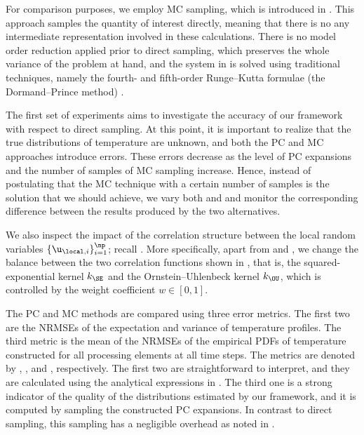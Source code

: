 For comparison purposes, we employ \ac{MC} sampling, which is introduced in
. This approach samples the quantity of interest directly, meaning
that there is no any intermediate representation involved in these calculations.
There is no model order reduction applied prior to direct sampling, which
preserves the whole variance of the problem at hand, and the system in
 is solved using traditional techniques, namely
the fourth- and fifth-order Runge--Kutta formulae (the Dormand--Prince method)
\cite{press2007}.


The first set of experiments aims to investigate the accuracy of our framework
with respect to direct sampling. At this point, it is important to realize that
the true distributions of temperature are unknown, and both the \ac{PC} and
\ac{MC} approaches introduce errors. These errors decrease as the level \lc of
\ac{PC} expansions and the number of samples \no of \ac{MC} sampling increase.
Hence, instead of postulating that the \ac{MC} technique with a certain number
of samples is the solution that we should achieve, we vary both \lc and \no and
monitor the corresponding difference between the results produced by the two
alternatives.

We also inspect the impact of the correlation structure between the local random
variables $\{ \u_{\local, i} \}_{i = 1}^\np$; recall
. More specifically, apart from \lc and \no,
we change the balance between the two correlation functions shown in
, that is, the squared-exponential kernel $k_\SE$ and
the Ornstein--Uhlenbeck kernel $k_\OU$, which is controlled by the weight
coefficient $w \in [0, 1]$.

The \ac{PC} and \ac{MC} methods are compared using three error metrics. The
first two are the \acp{NRMSE} of the expectation and variance of temperature
profiles. The third metric is the mean of the \acp{NRMSE} of the empirical
\acp{PDF} of temperature constructed for all processing elements at all time
steps. The metrics are denoted by \error{\expectation}, \error{\variance}, and
, respectively. The first two are straightforward to interpret, and
they are calculated using the analytical expressions in .
The third one is a strong indicator of the quality of the distributions
estimated by our framework, and it is computed by sampling the constructed
\ac{PC} expansions. In contrast to direct sampling, this sampling has a
negligible overhead as noted in .


